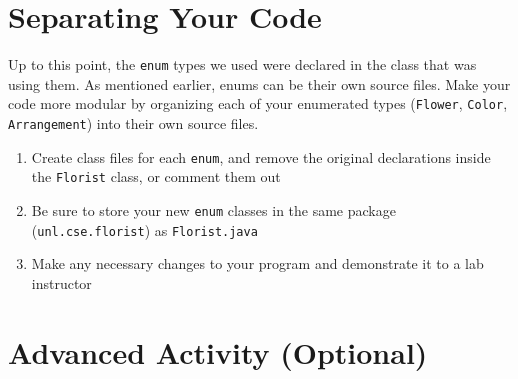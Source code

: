 \documentclass[12pt]{scrartcl}
\begin{document}
%
	
\section{Separating Your Code}

Up to this point, the \texttt{enum} types we used were declared in the 
class that was using them.  As mentioned earlier, enums can be their own source 
files.  Make your code more modular by organizing each of your enumerated types 
(\texttt{Flower}, \texttt{Color}, \texttt{Arrangement}) 
into their own source files.
\begin{enumerate}
  \item Create class files for each \texttt{enum}, and remove the original 
	declarations inside the \texttt{Florist} class, or comment them out
  \item Be sure to store your new \texttt{enum} classes in the same package 
	(\texttt{unl.cse.florist}) as \texttt{Florist.java}
  \item Make any necessary changes to your program and demonstrate it to a lab instructor
\end{enumerate}
	
\section{Advanced Activity (Optional)}
\end{document}
